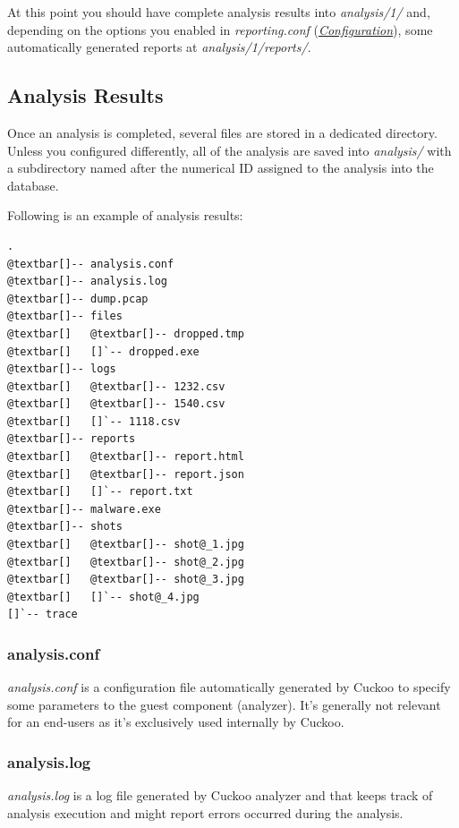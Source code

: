 \documentclass[letterpaper,10pt,english]{sphinxmanual}
\begin{document}
At this point you should have complete analysis results into \emph{analysis/1/} and,
depending on the options you enabled in \emph{reporting.conf}
({\hyperref[installation/host/configuration::doc]{\emph{Configuration}}}), some automatically generated
reports at \emph{analysis/1/reports/}.


\subsection{Analysis Results}
\label{usage/results::doc}\label{usage/results:analysis-results}
Once an analysis is completed, several files are stored in a dedicated directory.
Unless you configured differently, all of the analysis are saved into
\emph{analysis/} with a subdirectory named after the numerical ID assigned to the
analysis into the database.

Following is an example of analysis results:

\begin{Verbatim}[commandchars=@\[\]]
.
@textbar[]-- analysis.conf
@textbar[]-- analysis.log
@textbar[]-- dump.pcap
@textbar[]-- files
@textbar[]   @textbar[]-- dropped.tmp
@textbar[]   []`-- dropped.exe
@textbar[]-- logs
@textbar[]   @textbar[]-- 1232.csv
@textbar[]   @textbar[]-- 1540.csv
@textbar[]   []`-- 1118.csv
@textbar[]-- reports
@textbar[]   @textbar[]-- report.html
@textbar[]   @textbar[]-- report.json
@textbar[]   []`-- report.txt
@textbar[]-- malware.exe
@textbar[]-- shots
@textbar[]   @textbar[]-- shot@_1.jpg
@textbar[]   @textbar[]-- shot@_2.jpg
@textbar[]   @textbar[]-- shot@_3.jpg
@textbar[]   []`-- shot@_4.jpg
[]`-- trace
\end{Verbatim}


\subsubsection{analysis.conf}
\label{usage/results:analysis-conf}
\emph{analysis.conf} is a configuration file automatically generated by Cuckoo to
specify some parameters to the guest component (analyzer).
It's generally not relevant for an end-users as it's exclusively used internally
by Cuckoo.


\subsubsection{analysis.log}
\label{usage/results:analysis-log}
\emph{analysis.log} is a log file generated by Cuckoo analyzer and that keeps
track of analysis execution and might report errors occurred during the
analysis.
\end{document}
